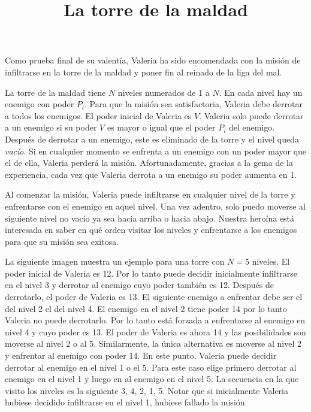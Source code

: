 \documentclass{oci}
\title{La torre de la maldad}
\begin{document}
\begin{problemDescription}
  Como prueba final de su valentía, Valeria ha sido encomendada con la misión de infiltrarse en la
  torre de la maldad y poner fin al reinado de la liga del mal.

  La torre de la maldad tiene $N$ niveles numerados de 1 a $N$.
  En cada nivel hay un enemigo con poder $P_i$.
  Para que la misión sea satisfactoria, Valeria debe derrotar a todos los enemigos.
  El poder inicial de Valeria es $V$.
  Valeria solo puede derrotar a un enemigo si su poder $V$ es mayor o igual que el poder $P_i$
  del enemigo.
  Después de derrotar a un enemigo, este es eliminado de la torre y el nivel queda \emph{vacío}.
  Si en cualquier momento se enfrenta a un enemigo con un poder mayor que el de ella, Valeria perderá
  la misión.
  Afortunadamente, gracias a la gema de la experiencia, cada vez que Valeria derrota a un enemigo
  su poder aumenta en 1.

  Al comenzar la misión, Valeria puede infiltrarse en cualquier nivel de la torre y
  enfrentarse con el enemigo en aquel nivel.
  Una vez adentro, solo puedo moverse al siguiente nivel no vacío ya sea hacia arriba o hacia abajo.
  Nuestra heroína está interesada en saber en qué orden visitar los niveles y enfrentarse a los enemigos
  para que su misión sea exitosa.

  La siguiente imagen muestra un ejemplo para una torre con $N=5$ niveles.
  El poder inicial de Valeria es $12$.
  Por lo tanto puede decidir inicialmente infiltrarse en el nivel 3 y derrotar al enemigo cuyo poder también es 12.
  Después de derrotarlo, el poder de Valeria es 13.
  El siguiente enemigo a enfrentar debe ser el del nivel 2 el del nivel 4.
  El enemigo en el nivel 2 tiene poder 14 por lo tanto Valeria no puede derrotarlo.
  Por lo tanto está forzada a enfrentarse al enemigo en nivel 4 y cuyo poder es 13.
  El poder de Valeria es ahora 14 y las posibilidades son moverse al nivel 2 o al 5.
  Similarmente, la única alternativa es moverse al nivel 2 y enfrentar al enemigo con poder 14.
  En este punto, Valeria puede decidir derrotar al enemigo en el nivel 1 o el 5.
  Para este caso elige primero derrotar al enemigo en el nivel 1 y luego en al enemigo en el nivel 5.
  La secuencia en la que visito los niveles es la siguiente 3, 4, 2, 1, 5.
  Notar que si inicialmente Valeria hubiese decidido infiltrarse en el nivel 1, hubiese
  fallado la misión.

  \begin{center}
\end{center}
\end{problemDescription}
\end{document}
